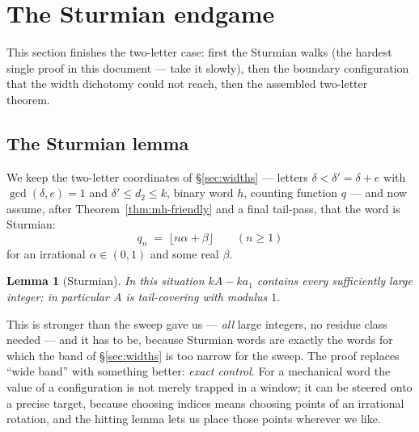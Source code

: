 \documentclass[11pt,reqno]{amsart}
\theoremstyle{plain}
\newtheorem{lemma}[theorem]{Lemma}
\theoremstyle{definition}
\theoremstyle{remark}
\begin{document}
\section{The Sturmian endgame}\label{sec:sturmian-endgame}

This section finishes the two-letter case: first the Sturmian walks (the hardest
single proof in this document --- take it slowly), then the boundary configuration
that the width dichotomy could not reach, then the assembled two-letter theorem.

\subsection{The Sturmian lemma}

We keep the two-letter coordinates of \S\ref{sec:widths} --- letters $\delta <
\delta' = \delta + e$ with $\gcd(\delta, e) = 1$ and $\delta' \le d_2 \le k$, binary
word $h$, counting function $q$ --- and now assume, after
Theorem~\ref{thm:mh-friendly} and a final tail-pass, that the word is Sturmian:
\[
  q_n \;=\; \lfloor n\alpha + \beta \rfloor \qquad (n \ge 1)
\]
for an irrational $\alpha \in (0,1)$ and some real $\beta$.

\begin{lemma}[Sturmian]\label{lem:sturmian-friendly}
In this situation $kA - k a_1$ contains every sufficiently large integer; in
particular $A$ is tail-covering with modulus $1$.
\end{lemma}

This is stronger than the sweep gave us --- \emph{all} large integers, no residue
class needed --- and it has to be, because Sturmian words are exactly the words for
which the band of \S\ref{sec:widths} is too narrow for the sweep. The proof replaces
``wide band'' with something better: \emph{exact control}. For a mechanical word the
value of a configuration is not merely trapped in a window; it can be steered onto a
precise target, because choosing indices means choosing points of an irrational
rotation, and the hitting lemma lets us place those points wherever we like.
\end{document}
